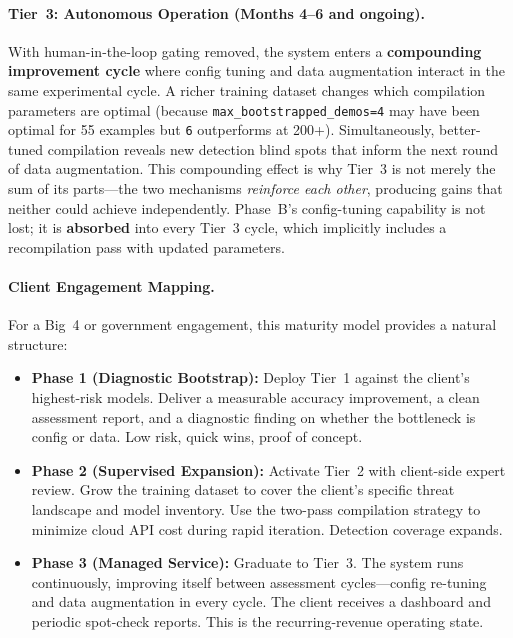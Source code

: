 \documentclass[11pt]{article}
\begin{document}
\paragraph{Tier~3: Autonomous Operation (Months 4--6 and ongoing).}
With human-in-the-loop gating removed, the system enters a
\textbf{compounding improvement cycle} where config tuning and data
augmentation interact in the same experimental cycle. A richer training
dataset changes which compilation parameters are optimal
(because \texttt{max\_bootstrapped\_demos=4} may have been optimal for 55
examples but \texttt{6} outperforms at 200+). Simultaneously, better-tuned
compilation reveals new detection blind spots that inform the next round
of data augmentation. This compounding effect is why Tier~3 is not merely
the sum of its parts---the two mechanisms \emph{reinforce each other},
producing gains that neither could achieve independently. Phase~B's
config-tuning capability is not lost; it is \textbf{absorbed} into every
Tier~3 cycle, which implicitly includes a recompilation pass with
updated parameters.

\paragraph{Client Engagement Mapping.}
For a Big~4 or government engagement, this maturity model provides
a natural structure:

\begin{itemize}[leftmargin=2em]
  \item \textbf{Phase 1 (Diagnostic Bootstrap):} Deploy Tier~1 against
  the client's highest-risk models. Deliver a measurable accuracy
  improvement, a clean assessment report, and a diagnostic finding on
  whether the bottleneck is config or data. Low risk, quick wins, proof
  of concept.

  \item \textbf{Phase 2 (Supervised Expansion):} Activate Tier~2 with
  client-side expert review. Grow the training dataset to cover the
  client's specific threat landscape and model inventory. Use the
  two-pass compilation strategy to minimize cloud API cost during
  rapid iteration. Detection coverage expands.

  \item \textbf{Phase 3 (Managed Service):} Graduate to Tier~3. The system
  runs continuously, improving itself between assessment cycles---config
  re-tuning and data augmentation in every cycle. The client receives a
  dashboard and periodic spot-check reports. This is the recurring-revenue
  operating state.
\end{itemize}
\end{document}
